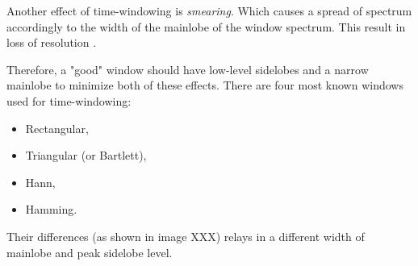 \documentclass[twoside]{ctuthesis}
\theoremstyle{plain}
\theoremstyle{definition}
\theoremstyle{note}
\begin{document}
Another effect of time-windowing is \textit{smearing}. Which causes a spread of spectrum accordingly to the width of the mainlobe of the window spectrum. This result in loss of resolution \cite{cite:3} .

Therefore, a "good" window should have low-level sidelobes and a narrow mainlobe to minimize both of these effects. There are four most known windows used for time-windowing: 
\begin{itemize}
	 \setlength{\itemsep}{5pt}
\item Rectangular,
	
\item Triangular (or Bartlett),
	
\item Hann,
	
\item Hamming.
\end{itemize}	
Their differences (as shown in image XXX) relays in a different width of mainlobe and peak sidelobe level.

\end{document}
